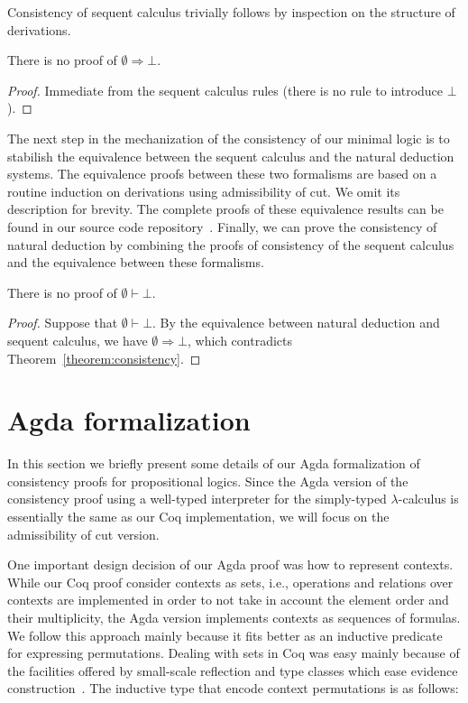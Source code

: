 Consistency of sequent calculus trivially follows by inspection on the structure of
derivations.

\begin{Theorem}\label{theorem:consistency}
  There is no proof of $\emptyset \Rightarrow \bot$.
\end{Theorem}
\begin{proof}
  Immediate from the sequent calculus rules (there is no rule to introduce $\bot$).
\end{proof}



The next step in the mechanization of the
consistency of our minimal logic is to stabilish the equivalence between the sequent
calculus and the natural deduction systems. The equivalence proofs between these two
formalisms are based on a routine induction on derivations using admissibility of
cut. We omit its description for brevity. The complete proofs of these
equivalence results can be found in our source code repository~\cite{Sasdelli20}. 
Finally, we can prove the consistency of natural deduction by combining the
proofs of consistency of the sequent calculus and the equivalence between these
formalisms.

\begin{Theorem}
  There is no proof of $\emptyset \vdash \bot$.
\end{Theorem}
\begin{proof}
  Suppose that $\emptyset \vdash \bot$. By the equivalence between natural
  deduction and sequent calculus, we have $\emptyset\Rightarrow \bot$, which
  contradicts Theorem~\ref{theorem:consistency}.
\end{proof}  



\section{Agda formalization}\label{sec:agda}


In this section we briefly present some details of our Agda formalization
of consistency proofs for propositional logics. Since the Agda version of the
consistency proof using a well-typed interpreter for the simply-typed
$\lambda$-calculus is essentially the same as our Coq implementation, we will focus
on the admissibility of cut version.


One important design decision of our Agda proof was how to represent contexts. While
our Coq proof consider contexts as sets, i.e., operations and relations over contexts
are implemented in order to not take in account the element order and their multiplicity,
the Agda version implements contexts as sequences of formulas. We follow this approach
mainly because it fits better as an inductive predicate for expressing permutations.
Dealing with sets in Coq was easy mainly because of the facilities offered by small-scale reflection
and type classes which ease evidence construction~\cite{GonthierM10,GonthierZND11}. The inductive
type that encode context permutations is as follows:

